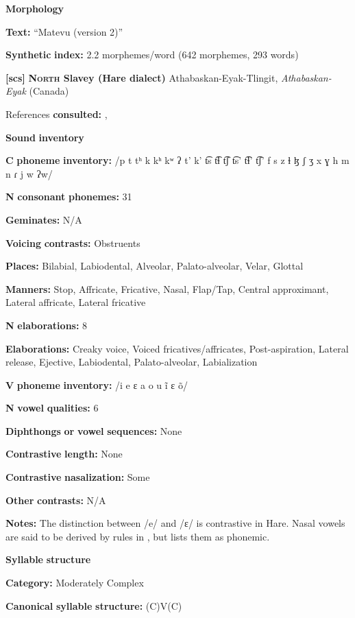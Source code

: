 \textbf{Morphology}

\textbf{Text:} “Matevu (version 2)” \citep[293-304]{Robinson2011}

\textbf{Synthetic} \textbf{index:} 2.2 morphemes/word (642 morphemes, 293 words)

\textbf{[scs]}   \textbf{\textsc{North} \textbf{Slavey} \textbf{(Hare} \textbf{dialect)}}  Athabaskan-Eyak-Tlingit, \textit{Athabaskan-Eyak} (Canada)

References \textbf{consulted:} \citet{Rice1989}, \citet{Rice2005}

\textbf{Sound} \textbf{inventory}

\textbf{C} \textbf{phoneme} \textbf{inventory:} /p t tʰ k kʰ kʷ ʔ t’ k’ t͡s t͡ɬ t͡ʃ t͡s’ t͡ɬ’ t͡ʃ’ f s z ɬ ɮ ʃ ʒ x ɣ h m n ɾ j w ʔw/

\textbf{N} \textbf{consonant} \textbf{phonemes:} 31

\textbf{Geminates:} N/A

\textbf{Voicing} \textbf{contrasts:} Obstruents

\textbf{Places:} Bilabial, Labiodental, Alveolar, Palato-alveolar, Velar, Glottal

\textbf{Manners:} Stop, Affricate, Fricative, Nasal, Flap/Tap, Central approximant, Lateral affricate, Lateral fricative

\textbf{N} \textbf{elaborations:} 8

\textbf{Elaborations:} Creaky voice, Voiced fricatives/affricates, Post-aspiration, Lateral release, Ejective, Labiodental, Palato-alveolar, Labialization

\textbf{V} \textbf{phoneme} \textbf{inventory:} /i e ɛ a o u ĩ ɛ õ/

\textbf{N} \textbf{vowel} \textbf{qualities:} 6

\textbf{Diphthongs} \textbf{or} \textbf{vowel} \textbf{sequences:} None

\textbf{Contrastive} \textbf{length:} None

\textbf{Contrastive} \textbf{nasalization:} Some

\textbf{Other} \textbf{contrasts:} N/A

\textbf{Notes:} The distinction between /e/ and /ɛ/ is contrastive in Hare. Nasal vowels are said to be derived by rules in \citet{Rice1989}, but \citet{Rice2005} lists them as phonemic.

\textbf{Syllable} \textbf{structure}

\textbf{Category:} Moderately Complex

\textbf{Canonical} \textbf{syllable} \textbf{structure:} (C)V(C) \citep[143-53]{Rice1989}

